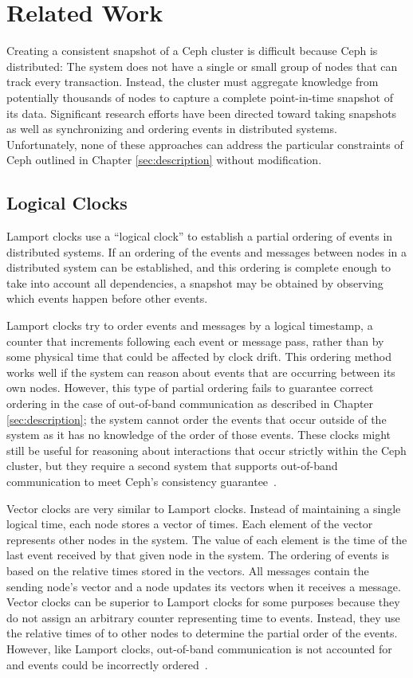 \chapter{Related Work}
\label{sec:rel-work}

Creating a consistent snapshot of a Ceph cluster is difficult because
Ceph is distributed: The system does not have a single or
small group of nodes that can track every transaction. Instead, the
cluster must aggregate knowledge from potentially thousands of nodes 
to capture a complete point-in-time snapshot of its data. 
Significant research efforts have been directed toward 
taking snapshots as well as synchronizing and ordering events 
in distributed systems. Unfortunately, none of these
approaches can address the particular constraints of Ceph outlined
in Chapter \ref{sec:description} without modification.

\section{Logical Clocks}

Lamport clocks use a ``logical clock'' to establish a partial ordering
of events in distributed systems. If an ordering of the events and
messages between nodes in a distributed system can be established, and
this ordering is complete enough to take into account all
dependencies, a snapshot may be obtained by observing which events
happen before other events. 

Lamport clocks try to order events and
messages by a logical timestamp, a counter that increments following
each event or message pass, rather than by some physical time that
could be affected by clock drift. This ordering method works well if
the system can reason about events that are occurring between its own
nodes. However, this type of partial ordering fails to guarantee
correct ordering in the case of out-of-band communication as described in Chapter \ref{sec:description}; the system
cannot order the events that occur outside of the system as it has no
knowledge of the order of those events. These clocks might still be
useful for reasoning about interactions that occur strictly within the
Ceph cluster, but they require a second system that supports
out-of-band communication to meet Ceph's consistency
guarantee~\citep{Lamport1978}.

Vector clocks are very similar to Lamport clocks. Instead of
maintaining a single logical time, each node stores a vector of
times. Each element of the vector represents other nodes in the system.
The value of each element is the time of the last event received
by that given node in the system. The ordering of
events is based on the relative times stored in the vectors. All
messages contain the sending node's vector and a node
updates its vectors when it receives a message. Vector clocks can be
superior to Lamport clocks for some purposes because they do not assign
an arbitrary counter representing time to events. Instead, they use the relative times of to other nodes to determine the partial order of the events. However, like Lamport clocks, out-of-band communication is not accounted for
and events could be incorrectly ordered~\citep{Fidge1988}.

